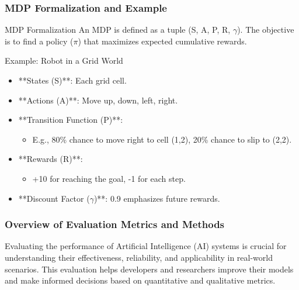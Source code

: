 \documentclass[aspectratio=169]{beamer}
\begin{document}
\begin{frame}[fragile]
    \frametitle{MDP Formalization and Example}
    \begin{block}{MDP Formalization}
        An MDP is defined as a tuple (S, A, P, R, $\gamma$). The objective is to find a policy ($\pi$) that maximizes expected cumulative rewards.
    \end{block}
    
    \begin{block}{Example: Robot in a Grid World}
        \begin{itemize}
            \item **States (S)**: Each grid cell.
            \item **Actions (A)**: Move up, down, left, right.
            \item **Transition Function (P)**:
                \begin{itemize}
                    \item E.g., 80\% chance to move right to cell (1,2), 20\% chance to slip to (2,2).
                \end{itemize}
            \item **Rewards (R)**: 
                \begin{itemize}
                    \item +10 for reaching the goal, -1 for each step.
                \end{itemize}
            \item **Discount Factor ($\gamma$)**: 0.9 emphasizes future rewards.
        \end{itemize}
    \end{block}
\end{frame}

\begin{frame}[fragile]
    \frametitle{Overview of Evaluation Metrics and Methods}
    Evaluating the performance of Artificial Intelligence (AI) systems is crucial for understanding their effectiveness, reliability, and applicability in real-world scenarios. This evaluation helps developers and researchers improve their models and make informed decisions based on quantitative and qualitative metrics.
\end{frame}
\end{document}
